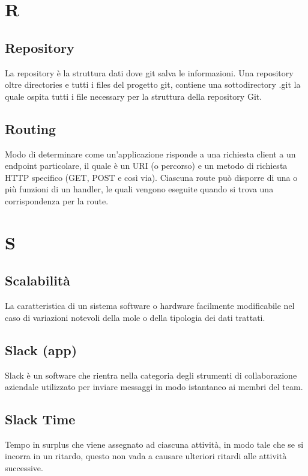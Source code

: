 {	
	\section{R}
	\subsection{Repository} 
	La repository è la struttura dati dove git salva le informazioni. Una repository oltre directories e tutti i files del progetto git, contiene una sottodirectory .git la quale ospita tutti i file necessary per la struttura della repository Git.

	\subsection{Routing} 
	Modo di determinare come un’applicazione risponde a una richiesta client a un endpoint particolare, il quale è un URI (o percorso) e un metodo di richiesta HTTP specifico (GET, POST e così via). Ciascuna route può disporre di una o più funzioni di un handler, le quali vengono eseguite quando si trova una corrispondenza per la route.

	\section{S}
	\subsection{Scalabilità}
	La caratteristica di un sistema software o hardware facilmente modificabile nel caso di variazioni notevoli della mole o della tipologia dei dati trattati.
	
	\subsection{Slack (app)} 
	Slack è un software che rientra nella categoria degli strumenti di collaborazione aziendale utilizzato per inviare messaggi in modo istantaneo ai membri del team.
	
	\subsection{Slack Time}
	Tempo in surplus che viene assegnato ad ciascuna attività, in modo tale che se si incorra in un ritardo, questo non vada a causare ulteriori ritardi alle attività successive.
	
}

